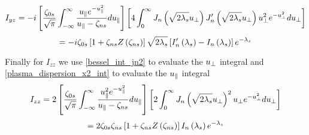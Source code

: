 \begin{equation*}
	I_{yz} = -i \left[ \frac{\zeta_{0s}}{\sqrt{\pi}} \int_{-\infty}^\infty \frac{u_\parallel e^{-u_\parallel^2}}{u_\parallel - \zeta_{ns}} du_\parallel \right] \left[ 4 \int_0^\infty J_n \left( \sqrt{2 \lambda_s} u_\perp \right) J_n' \left( \sqrt{2 \lambda_s} u_\perp \right) u_\perp^2 e^{-u_\perp^2} d u_\perp \right]
\end{equation*}
\begin{equation}
	= -i \zeta_{0s} \left[ 1 + \zeta_{ns} Z \left( \zeta_{ns} \right) \right] \sqrt{2 \lambda_s} \left[ I_n' \left( \lambda_s \right) - I_n \left( \lambda_s \right) \right] e^{-\lambda_s}
\end{equation}

Finally for $I_{zz}$ we use \eqref{bessel_int_jn2} to evaluate the $u_\perp$ integral and \eqref{plasma_dispersion_x2_int} to evaluate the $u_\parallel$ integral
\begin{equation*}
	I_{zz} = 2 \left[ \frac{\zeta_{0s}}{\sqrt{\pi}} \int_{-\infty}^\infty \frac{u_\parallel^2 e^{-u_\parallel^2}}{u_\parallel - \zeta_{ns}} du_\parallel \right] \left[ 2 \int_0^\infty J_n \left( \sqrt{2 \lambda_s} u_\perp \right)^2 u_\perp e^{-u_\perp^2} du_\perp \right]
\end{equation*}
\begin{equation}
	= 2 \zeta_{0s} \zeta_{ns} \left[ 1 + \zeta_{ns} Z \left( \zeta_{ns} \right) \right] I_n \left( \lambda_s \right) e^{-\lambda_s}
\end{equation}

